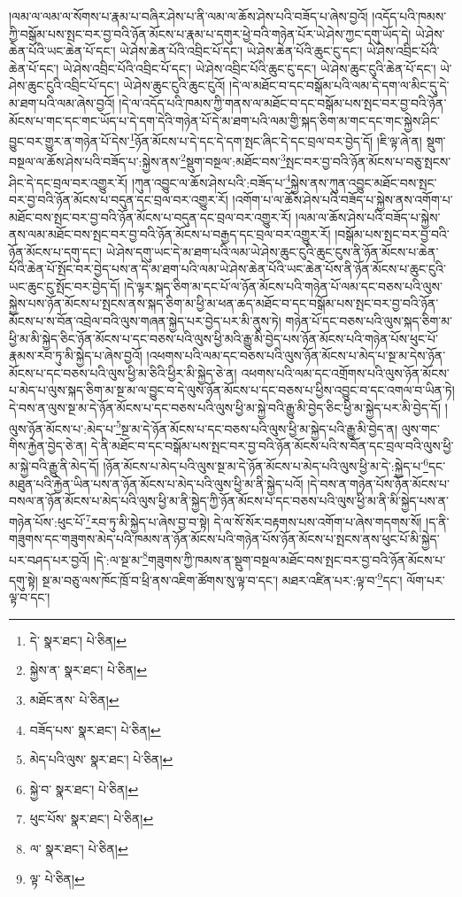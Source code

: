 །ལམ་ལ་ལམ་ལ་སོགས་པ་རྣམ་པ་བཞིར་ཤེས་པ་ནི་ལམ་ལ་ཆོས་ཤེས་པའི་བཟོད་པ་ཞེས་བྱའོ། །འདོད་པའི་ཁམས་ཀྱི་བསྒོམ་པས་སྤང་བར་བྱ་བའི་ཉོན་མོངས་པ་རྣམ་པ་དགུར་ཕྱེ་བའི་གཉེན་པོར་ཡེ་ཤེས་ཀྱང་དགུ་ཡོད་དེ། ཡེ་ཤེས་ཆེན་པོའི་ཡང་ཆེན་པོ་དང་། ཡེ་ཤེས་ཆེན་པོའི་འབྲིང་པོ་དང་། ཡེ་ཤེས་ཆེན་པོའི་ཆུང་ངུ་དང་། ཡེ་ཤེས་འབྲིང་པོའི་ཆེན་པོ་དང་། ཡེ་ཤེས་འབྲིང་པོའི་འབྲིང་པོ་དང་། ཡེ་ཤེས་འབྲིང་པོའི་ཆུང་ངུ་དང་། ཡེ་ཤེས་ཆུང་ངུའི་ཆེན་པོ་དང་། ཡེ་ཤེས་ཆུང་ངུའི་འབྲིང་པོ་དང་། ཡེ་ཤེས་ཆུང་ངུའི་ཆུང་ངུའོ། །དེ་ལ་མཐོང་བ་དང་བསྒོམ་པའི་ལམ་དེ་དག་ལ་མིང་དུ་དེ་མ་ཐག་པའི་ལམ་ཞེས་བྱའོ། །དེ་ལ་འདོད་པའི་ཁམས་ཀྱི་གནས་ལ་མཐོང་བ་དང་བསྒོམ་པས་སྤང་བར་བྱ་བའི་ཉོན་མོངས་པ་གང་དང་གང་ཡོད་པ་དེ་དག་དེའི་གཉེན་པོ་དེ་མ་ཐག་པའི་ལམ་གྱི་སྐད་ཅིག་མ་གང་དང་གང་སྐྱེས་ཤིང་བྱུང་བར་གྱུར་ན་གཉེན་པོ་དེས་\footnote{དེ་  སྣར་ཐང་།  པེ་ཅིན། }ཉོན་མོངས་པ་དེ་དང་དེ་དག་སྤང་ཞིང་དེ་དང་བྲལ་བར་བྱེད་དོ། །ཇི་ལྟ་ཞེ་ན། སྡུག་བསྔལ་ལ་ཆོས་ཤེས་པའི་བཟོད་པ་:སྐྱེས་ནས་\footnote{སྐྱེས་ན་  སྣར་ཐང་།  པེ་ཅིན། }སྡུག་བསྔལ་:མཐོང་བས་\footnote{མཐོང་ནས་  པེ་ཅིན། }སྤང་བར་བྱ་བའི་ཉོན་མོངས་པ་བཅུ་སྤངས་ཤིང་དེ་དང་བྲལ་བར་འགྱུར་རོ། །ཀུན་འབྱུང་ལ་ཆོས་ཤེས་པའི་:བཟོད་པ་\footnote{བཟོད་པས་  སྣར་ཐང་།  པེ་ཅིན། }སྐྱེས་ནས་ཀུན་འབྱུང་མཐོང་བས་སྤང་བར་བྱ་བའི་ཉོན་མོངས་པ་བདུན་དང་བྲལ་བར་འགྱུར་རོ། །འགོག་པ་ལ་ཆོས་ཤེས་པའི་བཟོད་པ་སྐྱེས་ནས་འགོག་པ་མཐོང་བས་སྤང་བར་བྱ་བའི་ཉོན་མོངས་པ་བདུན་དང་བྲལ་བར་འགྱུར་རོ། །ལམ་ལ་ཆོས་ཤེས་པའི་བཟོད་པ་སྐྱེས་ནས་ལམ་མཐོང་བས་སྤང་བར་བྱ་བའི་ཉོན་མོངས་པ་བརྒྱད་དང་བྲལ་བར་འགྱུར་རོ། །བསྒོམ་པས་སྤང་བར་བྱ་བའི་ཉོན་མོངས་པ་དགུ་དང་། ཡེ་ཤེས་དགུ་ཡང་དེ་མ་ཐག་པའི་ལམ་ཡེ་ཤེས་ཆུང་ངུའི་ཆུང་ངུས་ནི་ཉོན་མོངས་པ་ཆེན་པོའི་ཆེན་པོ་སྤོང་བར་བྱེད་པས་ན་དེ་མ་ཐག་པའི་ལམ་ཡེ་ཤེས་ཆེན་པོའི་ཡང་ཆེན་པོས་ནི་ཉོན་མོངས་པ་ཆུང་ངུའི་ཡང་ཆུང་ངུ་སྤོང་བར་བྱེད་དོ། །དེ་ལྟར་སྐད་ཅིག་མ་དང་པོ་ལ་ཉོན་མོངས་པའི་གཉེན་པོ་ལམ་དང་བཅས་པའི་ལུས་སྐྱེས་པས་ཉོན་མོངས་པ་སྤངས་ནས་སྐད་ཅིག་མ་ཕྱི་མ་ཕན་ཆད་མཐོང་བ་དང་བསྒོམ་པས་སྤང་བར་བྱ་བའི་ཉོན་མོངས་པ་ས་བོན་འབྲེལ་བའི་ལུས་གཞན་སྐྱེད་པར་བྱེད་པར་མི་ནུས་ཏེ། གཉེན་པོ་དང་བཅས་པའི་ལུས་སྐད་ཅིག་མ་ཕྱི་མ་མི་སྐྱེད་ཅིང་ཉོན་མོངས་པ་དང་བཅས་པའི་ལུས་ཕྱི་མའི་རྒྱུ་མི་བྱེད་པས་ཉོན་མོངས་པའི་གཉེན་པོས་ཕུང་པོ་རྣམས་རབ་ཏུ་མི་སྐྱེད་པ་ཞེས་བྱའོ། །འཕགས་པའི་ལམ་དང་བཅས་པའི་ལུས་ཉོན་མོངས་པ་མེད་པ་སྔ་མ་དེས་ཉོན་མོངས་པ་དང་བཅས་པའི་ལུས་ཕྱི་མ་ཅིའི་ཕྱིར་མི་སྐྱེད་ཅེ་ན། འཕགས་པའི་ལམ་དང་འགྲོགས་པའི་ལུས་ཉོན་མོངས་པ་མེད་པ་ལུས་སྐད་ཅིག་མ་སྔ་མ་ལ་བྱུང་བ་དེ་ལུས་ཉོན་མོངས་པ་དང་བཅས་པ་ཕྱིས་འབྱུང་བ་དང་འགལ་བ་ཡིན་ཏེ། དེ་བས་ན་ལུས་སྔ་མ་དེ་ཉོན་མོངས་པ་དང་བཅས་པའི་ལུས་ཕྱི་མ་སྐྱེ་བའི་རྒྱུ་མི་བྱེད་ཅིང་ཕྱི་མ་སྐྱེད་པར་མི་བྱེད་དོ། །ལུས་ཉོན་མོངས་པ་:མེད་པ་\footnote{མེད་པའི་ལུས་  སྣར་ཐང་།  པེ་ཅིན། }སྔ་མ་དེ་ཉོན་མོངས་པ་དང་བཅས་པའི་ལུས་ཕྱི་མ་སྐྱེད་པའི་རྒྱུ་མི་བྱེད་ན། ལུས་གང་གིས་རྐྱེན་བྱེད་ཅེ་ན། དེ་ནི་མཐོང་བ་དང་བསྒོམ་པས་སྤང་བར་བྱ་བའི་ཉོན་མོངས་པའི་ས་བོན་དང་བྲལ་བའི་ལུས་ཕྱི་མ་སྐྱེ་བའི་རྒྱུ་ནི་མེད་དོ། །ཉོན་མོངས་པ་མེད་པའི་ལུས་སྔ་མ་དེ་ཉོན་མོངས་པ་མེད་པའི་ལུས་ཕྱི་མ་དེ་:སྐྱེད་པ་\footnote{སྐྱེ་བ་  སྣར་ཐང་།  པེ་ཅིན། }དང་མཐུན་པའི་རྐྱེན་ཡིན་པས་ན་ཉོན་མོངས་པ་མེད་པའི་ལུས་ཕྱི་མ་ནི་སྐྱེད་པའོ། །དེ་བས་ན་གཉེན་པོས་ཉོན་མོངས་པ་བསལ་ན་ཉོན་མོངས་པ་མེད་པའི་ལུས་ཕྱི་མ་ནི་སྐྱེད་ཀྱི་ཉོན་མོངས་པ་དང་བཅས་པའི་ལུས་ཕྱི་མ་ནི་མི་སྐྱེད་པས་ན་གཉེན་པོས་:ཕུང་པོ་\footnote{ཕུང་པོས་  སྣར་ཐང་།  པེ་ཅིན། }རབ་ཏུ་མི་སྐྱེད་པ་ཞེས་བྱ་བ་སྟེ། དེ་ལ་སོ་སོར་བརྟགས་པས་འགོག་པ་ཞེས་གདགས་སོ། །ད་ནི་གཟུགས་དང་གཟུགས་མེད་པའི་ཁམས་ན་ཉོན་མོངས་པའི་གཉེན་པོས་ཉོན་མོངས་པ་སྤངས་ནས་ཕུང་པོ་མི་སྐྱེད་པར་བཤད་པར་བྱའོ། །དེ་:ལ་སྔ་མ་\footnote{ལ་  སྣར་ཐང་།  པེ་ཅིན། }གཟུགས་ཀྱི་ཁམས་ན་སྡུག་བསྔལ་མཐོང་བས་སྤང་བར་བྱ་བའི་ཉོན་མོངས་པ་དགུ་སྟེ། སྔ་མ་བཅུ་ལས་ཁོང་ཁྲོ་བ་ཕྲི་ནས་འཇིག་ཚོགས་སུ་ལྟ་བ་དང་། མཐར་འཛིན་པར་:ལྟ་བ་\footnote{ལྟ་  པེ་ཅིན། }དང་། ལོག་པར་ལྟ་བ་དང་། 